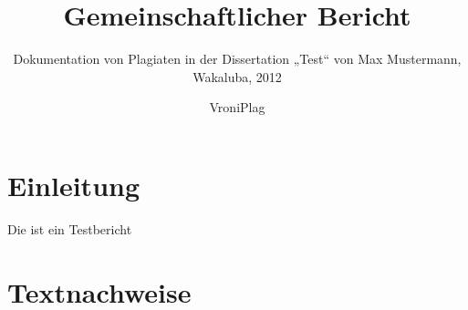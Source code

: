 \documentclass[ngerman,final,fontsize=12pt,paper=a4,twoside,bibliography=totocnumbered,BCOR=8mm,draft=false]{scrartcl}
\author{VroniPlag}
\title{Gemeinschaftlicher Bericht}
\subtitle{Dokumentation von Plagiaten in der Dissertation „Test“ von Max Mustermann, Wakaluba, 2012}
\newcommand{\BackgroundPic}
	{\put(0,0){\parbox[b][\paperheight]{\paperwidth}{%
		\vfill%
		\centering%
		\texttt{[image: background.png]}%
		\vfill%
	}}}
\begin{document}
\maketitle\thispagestyle{empty}

\tableofcontents
\newpage

\section{Einleitung}

Die ist ein Testbericht



\appendix
\section{Textnachweise}
\end{document}
